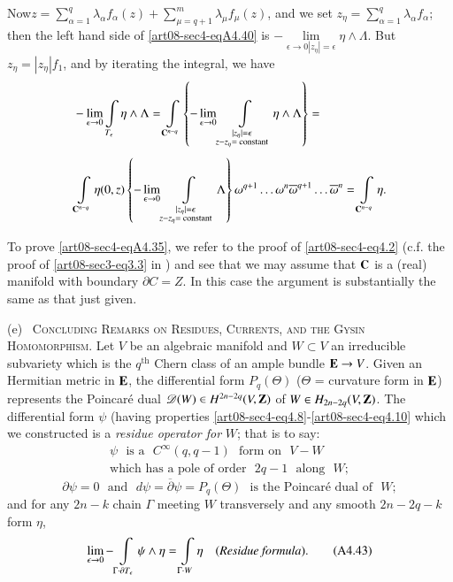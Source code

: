 Now\pageoriginale $z=\sum\limits^{q}_{\alpha=1}\lambda_{\alpha}f_{\alpha}(z)+\sum\limits^{m}_{\mu=q+1}\lambda_{\mu}f_{\mu}(z)$, and we set $z_{\eta}=\sum\limits^{q}_{\alpha=1}\lambda_{\alpha}f_{\alpha}$; then the left hand side of \eqref{art08-sec4-eqA4.40} is $-\lim\limits_{\epsilon\to 0|z_{\eta}|=\epsilon}\eta\wedge \Lambda$. But $z_{\eta}=|z_{\eta}|f_{1}$, and by iterating the integral, we have
\begin{align*}
& -\lim\limits_{\epsilon\to 0}\int\limits_{T_{\epsilon}}\eta\wedge \Lambda=\int\limits_{\mathbf{C}^{n-q}}\left\{-\lim\limits_{\epsilon\to 0}\int\limits_{\substack{|z_{\eta}|=\epsilon\\ z-z_{\eta}=\text{~constant}}}\eta\wedge \Lambda\right\}=\\[4pt]
& \int\limits_{\mathbf{C}^{n-q}}\eta(0,z)\left\{-\lim\limits_{\epsilon\to 0}\int\limits_{\substack{|z_{\eta}|=\epsilon\\ z-z_{\eta}=\text{~constant}}}\Lambda\right\}\omega^{q+1}\ldots\omega^{n}\overline{\omega}^{q+1}\ldots \overline{\omega}^{n}=\int\limits_{\mathbf{C}^{n-q}}\eta.
\end{align*}

To prove \eqref{art08-sec4-eqA4.35}, we refer to the proof of \eqref{art08-sec4-eq4.2} (c.f. the proof of \eqref{art08-sec3-eq3.3} in \cite{art08-key9}) and see that we may assume that $\mathbf{C}$ is a (real) manifold with boundary $\partial C=Z$. In this case the argument is substantially the same as that just given.

(e)~ \textsc{Concluding Remarks on Residues, Currents, and the Gysin Homomorphism.} Let $V$ be an algebraic manifold and $W\subset V$ an irreducible subvariety which is the $q^{\text{th}}$ Chern class of an ample bundle $\mathbf{E}\to V$. Given an Hermitian metric in $\mathbf{E}$, the differential form $P_{q}(\Theta)$ ($\Theta$ = curvature form in $\mathbf{E}$) represents the Poincar\'e dual $\mathscr{D}(W)\in H^{2n-2q}(V,\mathbf{Z})$ of $W\in H_{2n-2q}(V,\mathbf{Z})$. The differential form $\psi$ (having properties \eqref{art08-sec4-eq4.8}-\eqref{art08-sec4-eq4.10} which we constructed is a {\em residue operator for} $W$; that is to say:
\begin{equation*}
\begin{array}{l}
\psi\text{~ is a~ }C^{\infty}(q,q-1)\text{~ form on~ } V-W\\
\text{which has a pole of order~ }2q-1\text{~ along~ } W;
\end{array}\tag{A4.41}\label{art08-sec4-eqA4.41}
\end{equation*}
\begin{equation*}
\partial \psi=0\text{~ and~ } d\psi=\overline{\partial}\psi=P_{q}(\Theta) \text{~ is the Poincar\'e dual of~ } W;\tag{A4.42}\label{art08-sec4-eqA4.42}
\end{equation*}
and for any $2n-k$ chain $\Gamma$ meeting $W$ transversely and any smooth $2n-2q-k$ form $\eta$,
\begin{equation*}
\lim\limits_{\epsilon\to 0}-\int\limits_{\Gamma\cdot \partial T_{\epsilon}}\psi\wedge \eta=\int\limits_{\Gamma\cdot W}\eta\quad(\text{\em Residue formula}).\tag{A4.43}\label{art08-sec4-eqA4.43}
\end{equation*}

